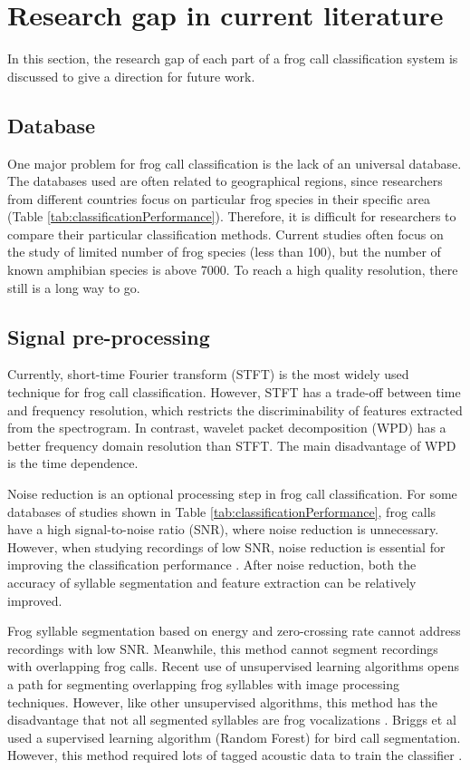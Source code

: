  
\section{Research gap in current literature}
\label{discussion}
In this section, the research gap of each part of a frog call classification system is discussed to give a direction for future work. 

\subsection{Database}
One major problem for frog call classification is the lack of an universal database. The databases used are often related to geographical regions, since researchers from different countries focus on particular frog species in their specific area (Table \ref{tab:classificationPerformance}). Therefore, it is difficult for researchers to compare their particular classification methods. Current studies often focus on the study of limited number of frog species (less than 100), but the number of known amphibian species is above 7000. To reach a high quality resolution, there still is a long way to go.


\subsection{Signal pre-processing}
Currently, short-time Fourier transform (STFT) is the most widely used technique for frog call classification. However, STFT has a trade-off between time and frequency resolution, which restricts the discriminability of features extracted from the spectrogram. 
In contrast, wavelet packet decomposition (WPD) has a better frequency domain resolution than STFT. The main disadvantage of WPD is the time dependence. 

Noise reduction is an optional processing step in frog call classification. For some databases of studies shown in Table \ref{tab:classificationPerformance}, frog calls have a high signal-to-noise ratio (SNR), where noise reduction is unnecessary. However, when studying recordings of low SNR, noise reduction is essential for improving the classification performance \citep{bedoya2014automatic, Huang20141}. After noise reduction, both the accuracy of syllable segmentation and feature extraction can be relatively improved.

Frog syllable segmentation based on energy and zero-crossing rate cannot address recordings with low SNR. Meanwhile, this method cannot segment recordings with overlapping frog calls. Recent use of unsupervised learning algorithms opens a path for segmenting overlapping frog syllables with image processing techniques. However, like other unsupervised algorithms, this method has the disadvantage that not all segmented syllables are frog vocalizations \citep{potamitis2015unsupervised}. Briggs et al used a supervised learning algorithm (Random Forest) for bird call segmentation. However, this method required lots of tagged acoustic data to train the classifier \citep{tjahja2015supervised}.


